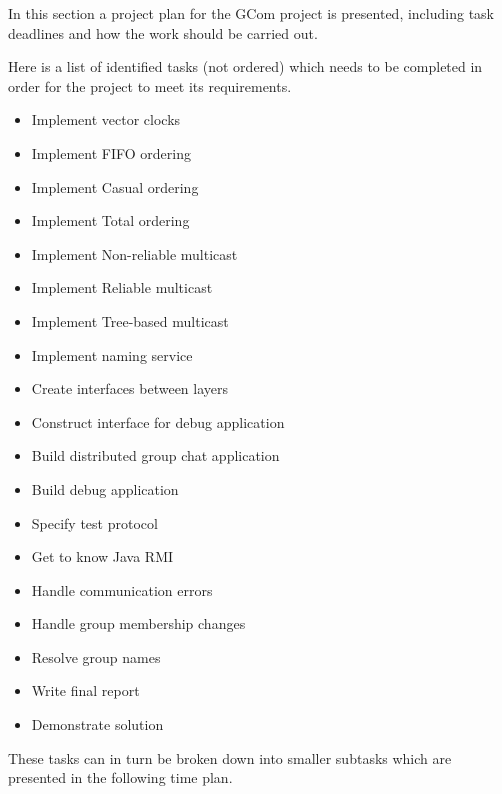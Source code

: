 
	In this section a project plan for the GCom project is presented, including task deadlines and how the work should be carried out.

		Here is a list of identified tasks (not ordered) which needs to be completed in order for the project to meet its requirements.
		\begin{itemize}
			\item Implement vector clocks
			\item Implement FIFO ordering
			\item Implement Casual ordering
			\item Implement Total ordering
			\item Implement Non-reliable multicast
			\item Implement Reliable multicast
			\item Implement Tree-based multicast
			\item Implement naming service
			\item Create interfaces between layers
			\item Construct interface for debug application
			\item Build distributed group chat application
			\item Build debug application
			\item Specify test protocol
			\item Get to know Java RMI
			\item Handle communication errors
			\item Handle group membership changes
			\item Resolve group names
			\item Write final report
			\item Demonstrate solution
		\end{itemize}

		These tasks can in turn be broken down into smaller subtasks which are presented in the following time plan.


